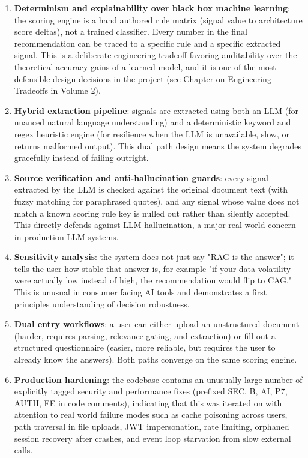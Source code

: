 \documentclass[11pt,a4paper]{report}
\begin{document}
\begin{enumerate}[leftmargin=*]
  \item \textbf{Determinism and explainability over black box machine learning}: the scoring engine is a hand authored rule matrix (signal value to architecture score deltas), not a trained classifier. Every number in the final recommendation can be traced to a specific rule and a specific extracted signal. This is a deliberate engineering tradeoff favoring auditability over the theoretical accuracy gains of a learned model, and it is one of the most defensible design decisions in the project (see Chapter on Engineering Tradeoffs in Volume 2).
  \item \textbf{Hybrid extraction pipeline}: signals are extracted using both an LLM (for nuanced natural language understanding) and a deterministic keyword and regex heuristic engine (for resilience when the LLM is unavailable, slow, or returns malformed output). This dual path design means the system degrades gracefully instead of failing outright.
  \item \textbf{Source verification and anti-hallucination guards}: every signal extracted by the LLM is checked against the original document text (with fuzzy matching for paraphrased quotes), and any signal whose value does not match a known scoring rule key is nulled out rather than silently accepted. This directly defends against LLM hallucination, a major real world concern in production LLM systems.
  \item \textbf{Sensitivity analysis}: the system does not just say "RAG is the answer"; it tells the user how stable that answer is, for example "if your data volatility were actually low instead of high, the recommendation would flip to CAG." This is unusual in consumer facing AI tools and demonstrates a first principles understanding of decision robustness.
  \item \textbf{Dual entry workflows}: a user can either upload an unstructured document (harder, requires parsing, relevance gating, and extraction) or fill out a structured questionnaire (easier, more reliable, but requires the user to already know the answers). Both paths converge on the same scoring engine.
  \item \textbf{Production hardening}: the codebase contains an unusually large number of explicitly tagged security and performance fixes (prefixed SEC, B, AI, P7, AUTH, FE in code comments), indicating that this was iterated on with attention to real world failure modes such as cache poisoning across users, path traversal in file uploads, JWT impersonation, rate limiting, orphaned session recovery after crashes, and event loop starvation from slow external calls.
\end{enumerate}
\end{document}
